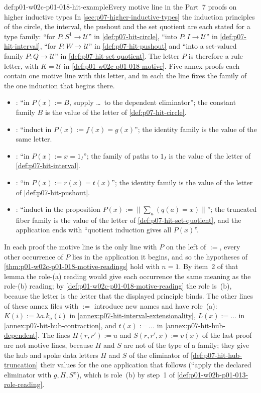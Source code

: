 \begin{hbexample}{def:p01-w02c-p01-018-hit-example}{Every motive line in the Part~7 proofs on higher inductive types}
In \cref{sec:p07-higher-inductive-types} the induction principles of the
circle, the interval, the pushout and the set quotient are each stated for
a type family: ``for \(P:S^1\to\mathcal U\)'' in
\cref{def:p07-hit-circle}, ``into \(P:I\to\mathcal U\)'' in
\cref{def:p07-hit-interval}, ``for \(P:W\to\mathcal U\)'' in
\cref{def:p07-hit-pushout} and ``into a set-valued family
\(P:Q\to\mathcal U\)'' in \cref{def:p07-hit-set-quotient}.  The letter
\(P\) is therefore a rule letter, with \(K=\mathcal U\) in
\cref{def:p01-w02c-p01-018-motive}.  Five annex proofs each contain one
motive line with this letter, and in each the line fixes the family of the
one induction that begins there.
\begin{itemize}
  \item {}: ``in \(P(x):=B\), supply
  \ldots\ to the dependent eliminator''; the constant family \(B\) is the
  value of the letter of \cref{def:p07-hit-circle}.
  \item {}: ``induct in
  \(P(x):=f(x)=g(x)\)''; the identity family is the value of the same
  letter.
  \item {}: ``in
  \(P(x):=x=1_I\)''; the family of paths to \(1_I\) is the value of the
  letter of \cref{def:p07-hit-interval}.
  \item {}: ``in
  \(P(x):=r(x)=t(x)\)''; the identity family is the value of the letter of
  \cref{def:p07-hit-pushout}.
  \item {}: ``induct in the
  proposition \(P(x):=\|\sum_a(q(a)=x)\|\)''; the truncated fiber family is
  the value of the letter of \cref{def:p07-hit-set-quotient}, and the
  application ends with ``quotient induction gives all \(P(x)\)''.
\end{itemize}
In each proof the motive line is the only line with \(P\) on the left of
\(:=\), every other occurrence of \(P\) lies in the application it begins,
and so the hypotheses of \cref{thm:p01-w02c-p01-018-motive-readings} hold
with \(n=1\).  By item~2 of that lemma the role-(a) reading would give each
occurrence the same meaning as the role-(b) reading; by
\cref{def:p01-w02c-p01-018-motive-reading} the role is~(b), because the
letter is the letter that the displayed principle binds.  The other lines
of these annex files with \(:=\) introduce new names and have role~(a):
\(K(i):=\lambda a.k_a(i)\) in \cref{annex:p07-hit-interval-extensionality},
\(L(x):=\ldots\) in \cref{annex:p07-hit-hub-contraction}, and
\(t(x):=\ldots\) in \cref{annex:p07-hit-hub-dependent}.  The lines
\(H(r,r'):=u\) and \(S(r,r',x):=v(x)\) of the last proof are not motive
lines, because \(H\) and \(S\) are not of the type of a family; they give
the hub and spoke data letters \(H\) and \(S\) of the eliminator of
\cref{def:p07-hit-hub-truncation} their values for the one application
that follows (``apply the declared eliminator with \(g,H,S\)''), which is
role~(b) by step~1 of \cref{def:p01-w02b-p01-013-role-reading}.
\end{hbexample}

